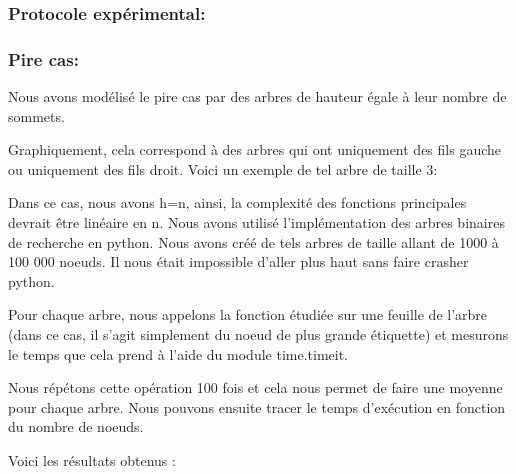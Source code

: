 \documentclass{report}
\begin{document}
\subsubsection{Protocole expérimental:}

\subsubsection{Pire cas:}
Nous avons modélisé le pire cas par des arbres de hauteur égale à leur nombre de sommets.

Graphiquement, cela correspond à des arbres qui ont uniquement des fils gauche ou uniquement des fils droit. Voici un exemple de tel arbre de taille 3:

\begin{center}
\end{center}

Dans ce cas, nous avons h=n, ainsi, la complexité des fonctions principales devrait être linéaire en n. \newline \newline
Nous avons utilisé l'implémentation des arbres binaires de recherche en python.
Nous avons créé de tels arbres de taille allant de 1000 à 100 000 noeuds. Il nous était impossible d'aller plus haut sans faire crasher python.

Pour chaque arbre, nous appelons la fonction étudiée sur une feuille de l'arbre (dans ce cas, il s'agit simplement du noeud de plus grande étiquette) et mesurons le temps que cela prend à l'aide du module time.timeit. 

Nous répétons cette opération 100 fois et cela nous permet de faire une moyenne pour chaque arbre. Nous pouvons ensuite tracer le temps d'exécution en fonction du nombre de noeuds.

Voici les résultats obtenus :
\end{document}
